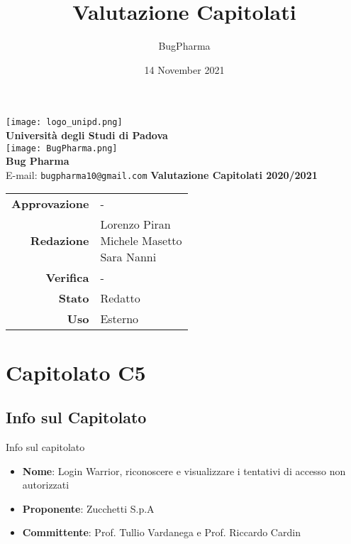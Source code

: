 \documentclass[11pt]{article}
\title{Valutazione Capitolati}
\author{BugPharma }
\date{14 November 2021}
\begin{document}
\thispagestyle{empty}
	\begin{titlepage}
		\begin{center}
			\texttt{[image: logo\_unipd.png]}\\
			\large \textbf{Università degli Studi di Padova} \\
			\vfill
			\texttt{[image: BugPharma.png]}\\
			\large \textbf{Bug Pharma} \\
			\vfill
			\large
			E-mail: 
			\texttt{bugpharma10@gmail.com}
			\vfill
			\Huge \textbf{Valutazione Capitolati 2020/2021}\\
			
			\large
			
			
			\vfill
			
			
			\begin{tabular}{r|l}
				\textbf{Approvazione} &  -\\
				\textbf{Redazione} &  \parbox[t]{5cm}{Lorenzo Piran \\Michele Masetto \\ Sara Nanni}\\
				\textbf{Verifica} &  -\\
				\textbf{Stato} & Redatto \\
				\textbf{Uso} & Esterno
			\end{tabular}
			\vfill
			
		\end{center}
	\end{titlepage}


\maketitle

\tableofcontents
\newpage

\section{Capitolato C5}
    \subsection{Info sul Capitolato} Info sul capitolato
    \begin{itemize}
        \item \textbf{Nome}: Login Warrior, riconoscere e visualizzare i tentativi di accesso non autorizzati
        \item \textbf{Proponente}: Zucchetti S.p.A
        \item \textbf{Committente}: Prof. Tullio Vardanega e Prof. Riccardo Cardin
    \end{itemize}
\end{document}
